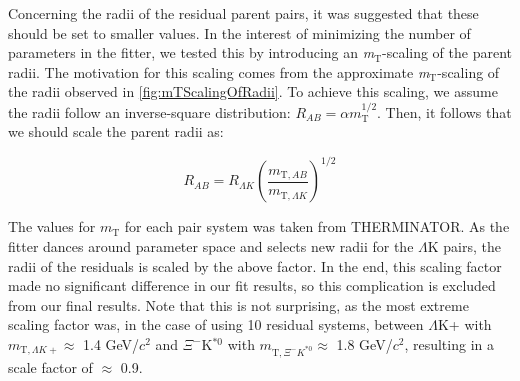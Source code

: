 \documentclass[../AnalysisNoteJBuxton.tex]{subfiles}
\begin{document}
Concerning the radii of the residual parent pairs, it was suggested that these should be set to smaller values.  In the interest of minimizing the number of parameters in the fitter, we tested this by introducing an \textit{m}$_{\mathrm{T}}$-scaling of the parent radii.  The motivation for this scaling comes from the approximate \textit{m}$_{\mathrm{T}}$-scaling of the radii observed in \ref{fig:mTScalingOfRadii}.  To achieve this scaling, we assume the radii follow an inverse-square distribution: $R_{AB} = \alpha m_{\mathrm{T}}^{1/2}$.  Then, it follows that we should scale the parent radii as:

\begin{equation}
R_{AB} = R_{\Lambda K}\left(\frac{m_{\mathrm{T},AB}}{m_{\mathrm{T},\Lambda K}}\right)^{1/2}
\end{equation}

The values for $m_{\mathrm{T}}$ for each pair system was taken from THERMINATOR.  As the fitter dances around parameter space and selects new radii for the $\Lambda$K pairs, the radii of the residuals is scaled by the above factor.  In the end, this scaling factor made no significant difference in our fit results, so this complication is excluded from our final results.  Note that this is not surprising, as the most extreme scaling factor was, in the case of using 10 residual systems, between $\Lambda$K+ with $m_{\mathrm{T},\Lambda K+} \approx$ 1.4 GeV/$c^{2}$ and $\Xi^{-}$K$^{*0}$ with $m_{\mathrm{T},\Xi^{-} K^{*0}} \approx$ 1.8 GeV/$c^{2}$, resulting in a scale factor of $\approx$ 0.9.
\end{document}
